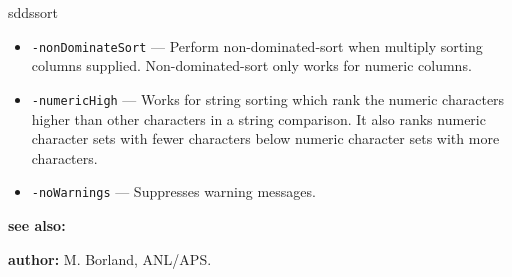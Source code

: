 \begin{sddsprog}{sddssort}
\begin{itemize}
      \item \verb|-nonDominateSort| --- Perform non-dominated-sort when multiply sorting columns supplied. Non-dominated-sort only works for numeric columns.
      \item \verb|-numericHigh| --- Works for string sorting which rank the numeric characters higher than other characters in a string comparison. It also ranks numeric character sets with fewer characters below numeric character sets with more characters.
      \item \verb|-noWarnings| --- Suppresses warning messages.
    \end{itemize}
  \item \textbf{see also:} 
  \item \textbf{author:} M. Borland, ANL/APS.
\end{sddsprog}

